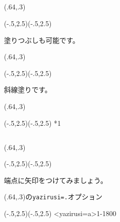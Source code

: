 \documentclass[a4j]{jarticle}
\begin{document}
\subsection{\texorpdfstring{}{En}}
\begin{showEx}(.64,.3){}
\begin{pszahyou}[ul=10mm](-.5,2.5)(-.5,2.5)
  \Kuromaru\C
\end{pszahyou}
\end{showEx}

塗りつぶしも可能です。

\begin{showEx}(.64,.3){}
\begin{pszahyou}[ul=10mm](-.5,2.5)(-.5,2.5)
  \Kuromaru\C
\end{pszahyou}
\end{showEx}

斜線塗りです。

\begin{showEx}(.64,.3){}
\begin{pszahyou}[ul=10mm](-.5,2.5)(-.5,2.5)
  \En**{\C}{1}
  \Kuromaru\C
\end{pszahyou}
\end{showEx}

\subsection{\texorpdfstring{}{Enko}}
\begin{showEx}(.64,.3){}
\begin{pszahyou}[ul=10mm](-.5,2.5)(-.5,2.5)
  \Kuromaru\C
  \Hasen{\A\B}
\end{pszahyou}
\end{showEx}

端点に矢印をつけてみましょう。

\begin{showEx}(.64,.3){の\texttt{yazirusi=.}オプション}
\begin{pszahyou}[ul=10mm](-.5,2.5)(-.5,2.5)
  \Kuromaru\C
  \Enko<yazirusi=a>{\C}{1}{-180}{0}
  \Hasen{\A\B}
\end{pszahyou}
\end{showEx}
\end{document}
